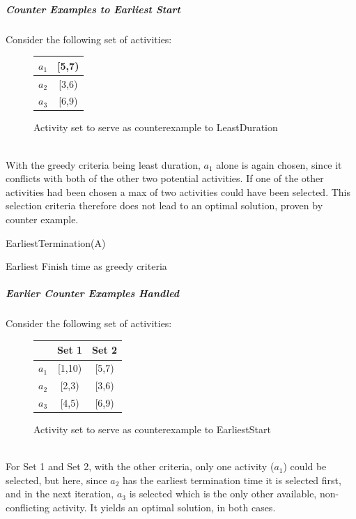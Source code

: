 \documentclass[12pt,letterpaper]{article}
\begin{document}
\subparagraph{Counter Examples to Earliest Start} Consider the following set of activities: \\
\begin{figure}[h]
\centering
\begin{tabular}{|c|c|}
\hline
$a_1$ & [5,7)\\ \hline
$a_2$ & [3,6)\\ \hline
$a_3$ & [6,9)\\ \hline
\end{tabular}
\caption{Activity set to serve as counterexample to LeastDuration}
\end{figure}\\
With the greedy criteria being least duration, $a_1$ alone is again chosen, since it conflicts with both of the other two potential activities. If one of the other activities had been chosen a max of two activities could have been selected. This selection criteria therefore does not lead to an optimal solution, proven by counter example.
\begin{algorithm}[h]
EarliestTermination(A)
\caption{Earliest Finish time as greedy criteria}
\label{Early Finish Greedy}
\end{algorithm}
\subparagraph{Earlier Counter Examples Handled} Consider the following set of activities: \\
\begin{figure}[h]
\centering
\begin{tabular}{|c|c|c|}
\hline
\quad & Set 1 & Set 2 \\ \hline
$a_1$ & [1,10) & [5,7) \\ \hline
$a_2$ & [2,3) & [3,6) \\ \hline
$a_3$ & [4,5) & [6,9)\\ \hline
\end{tabular}
\caption{Activity set to serve as counterexample to EarliestStart}
\end{figure}\\
For Set 1 and Set 2, with the other criteria, only one activity ($a_1$) could be selected, but here, since $a_2$ has the earliest termination time it is selected first, and in the next iteration, $a_3$ is selected which is the only other available, non-conflicting activity. It yields an optimal solution, in both cases.\\
\end{document}
